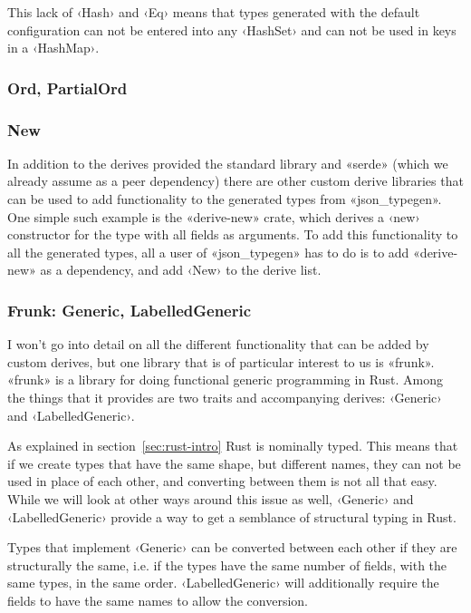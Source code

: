 This lack of ‹Hash› and ‹Eq› means that types generated with the default configuration can not be entered into any ‹HashSet› and can not be used in keys in a ‹HashMap›.

\subsubsection{Ord, PartialOrd}


\subsubsection{New}

In addition to the derives provided the standard library and «serde»  (which we already assume as a peer dependency) there are other custom derive libraries that can be used to add functionality to the generated types from «json_typegen». One simple such example is the «derive-new» crate, which derives a ‹new› constructor for the type with all fields as arguments. To add this functionality to all the generated types, all a user of «json_typegen» has to do is to add «derive-new» as a dependency, and add ‹New› to the derive list.

\subsubsection{Frunk: Generic, LabelledGeneric}

I won't go into detail on all the different functionality that can be added by custom derives, but one library that is of particular interest to us is «frunk». «frunk» is a library for doing functional generic programming in Rust. Among the things that it provides are two traits and accompanying derives: ‹Generic› and ‹LabelledGeneric›.


As explained in section~\ref{sec:rust-intro} Rust is nominally typed. This means that if we create types that have the same shape, but different names, they can not be used in place of each other, and converting between them is not all that easy. While we will look at other ways around this issue as well, ‹Generic› and ‹LabelledGeneric› provide a way to get a semblance of structural typing in Rust.

Types that implement ‹Generic› can be converted between each other if they are structurally the same, i.e. if the types have the same number of fields, with the same types, in the same order. ‹LabelledGeneric› will additionally require the fields to have the same names to allow the conversion.

